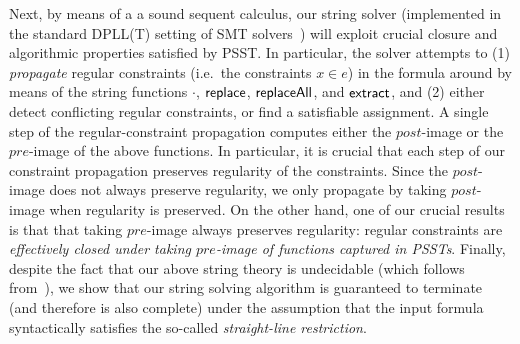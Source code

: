 Next, by means of a a sound sequent calculus, our string solver (implemented in 
the standard DPLL(T) setting of SMT solvers~\cite{NieuwenhuisetalJACM2006}) 
will exploit crucial closure and algorithmic properties satisfied by PSST.
In particular, the solver attempts to
(1) \emph{propagate} regular constraints (i.e.\ the constraints $x \in e$) in the formula around by means of
the string functions $\cdot$, $\mathsf{replace}$, $\mathsf{replaceAll}$, and $\mathsf{extract}$, and 
(2) either detect conflicting regular constraints, or find a satisfiable assignment.
A single step of the regular-constraint propagation computes either the 
$post$-image or the $pre$-image of the above functions. In particular, 
it is crucial that each step of our constraint propagation preserves
regularity of the constraints.
Since the $post$-image does not always preserve regularity,
we only propagate by taking $post$-image when regularity is preserved.
On the other hand, one of our crucial results is that that taking $pre$-image 
always preserves regularity:
regular constraints are \emph{effectively closed under
taking $pre$-image of functions captured in PSSTs}.
Finally, despite the fact that our above string theory is undecidable
(which follows from~\cite{LB16}), we show that our string solving algorithm is
guaranteed to terminate (and therefore is also complete) under the assumption
that the input formula syntactically satisfies the so-called 
\emph{straight-line restriction}.

